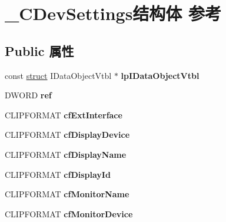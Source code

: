 \hypertarget{struct___c_dev_settings}{}\section{\+\_\+\+C\+Dev\+Settings结构体 参考}
\label{struct___c_dev_settings}
\subsection*{Public 属性}
\begin{DoxyCompactItemize}
\item 
\mbox{\label{struct___c_dev_settings_a49c504b01e71ba9a8aad58ecbd768279}} 
const \hyperlink{interfacestruct}{struct} I\+Data\+Object\+Vtbl $\ast$ {\bfseries lp\+I\+Data\+Object\+Vtbl}
\item 
\mbox{\label{struct___c_dev_settings_a19f1f96835ee3be7fe371618cdaf1825}} 
D\+W\+O\+RD {\bfseries ref}
\item 
\mbox{\label{struct___c_dev_settings_a75d6abc3606d04b266cab91ab6ecc2f0}} 
C\+L\+I\+P\+F\+O\+R\+M\+AT {\bfseries cf\+Ext\+Interface}
\item 
\mbox{\label{struct___c_dev_settings_af8ab0b2d4a97c18a402996548d6087dc}} 
C\+L\+I\+P\+F\+O\+R\+M\+AT {\bfseries cf\+Display\+Device}
\item 
\mbox{\label{struct___c_dev_settings_ad0f9dcaf0ffd1207aaa5555475ed5124}} 
C\+L\+I\+P\+F\+O\+R\+M\+AT {\bfseries cf\+Display\+Name}
\item 
\mbox{\label{struct___c_dev_settings_a905aacfefcc2ac07df4fb6d47847363c}} 
C\+L\+I\+P\+F\+O\+R\+M\+AT {\bfseries cf\+Display\+Id}
\item 
\mbox{\label{struct___c_dev_settings_a39fed43cffbe3e0141705d3ed566f946}} 
C\+L\+I\+P\+F\+O\+R\+M\+AT {\bfseries cf\+Monitor\+Name}
\item 
\mbox{\label{struct___c_dev_settings_a85b9d609dd6ba6035862f6b052165f06}} 
C\+L\+I\+P\+F\+O\+R\+M\+AT {\bfseries cf\+Monitor\+Device}

\end{DoxyCompactItemize}
